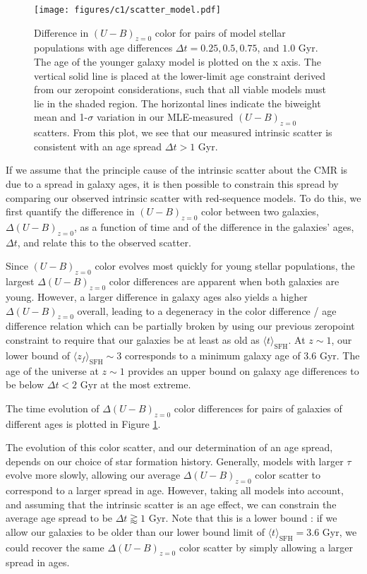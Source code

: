 \begin{figure}
\texttt{[image: figures/c1/scatter\_model.pdf]}
\caption[Using the color-magnitude relation scatter to constrain scatter in red-sequence ages]{Difference in $(U-B)_{z=0}$ color for pairs of model stellar populations with age differences $\Delta t = 0.25, 0.5, 0.75$, and $1.0$ Gyr. The age of the younger galaxy model is plotted on the x axis. The vertical solid line is placed at the lower-limit age constraint derived from our zeropoint considerations, such that all viable models must lie in the shaded region. The horizontal lines indicate the biweight mean and 1-$\sigma$ variation in our MLE-measured $(U-B)_{z=0}$ scatters. From this plot, we see that our measured intrinsic scatter is consistent with an age spread $\Delta t > 1$ Gyr.
\label{fig-scatmodel}}
\end{figure}

If we assume that the principle cause of the intrinsic scatter about the CMR is due to a spread in galaxy ages, it is then possible to constrain this spread by comparing our observed intrinsic scatter with red-sequence models. To do this, we first quantify the difference in $(U-B)_{z=0}$ color between two galaxies, $\Delta(U-B)_{z=0}$, as a function of time and of the difference in the galaxies' ages, $\Delta t$, and relate this to the observed scatter.

Since $(U-B)_{z=0}$ color evolves most quickly for young stellar populations, the largest $\Delta(U-B)_{z=0}$ color differences are apparent when both galaxies are young.
However, a larger difference in galaxy ages also yields a higher $\Delta(U-B)_{z=0}$ overall, leading to a degeneracy in the color difference / age difference relation which can be partially broken by using our previous zeropoint constraint to require that our galaxies be at least as old as $\langle t \rangle_\mathrm{SFH}$.
At $z \sim 1$, our lower bound of $\langle z_f \rangle_\mathrm{SFH} \sim 3$ corresponds to a minimum galaxy age of 3.6 Gyr.
The age of the universe at $z \sim 1$ provides an upper bound on galaxy age differences to be below $\Delta t < 2 $ Gyr at the most extreme.

The time evolution of $\Delta(U-B)_{z=0}$ color differences for pairs of galaxies of different ages is plotted in Figure \ref{fig-scatmodel}.

The evolution of this color scatter, and our determination of an age spread, depends on our choice of star formation history. Generally, models with larger $\tau$ evolve more slowly, allowing our average $\Delta(U-B)_{z=0}$ color scatter to correspond to a larger spread in age. However, taking all models into account, and assuming that the intrinsic scatter is an age effect, we can constrain the average age spread to be $\Delta t \gtrapprox 1$ Gyr. Note that this is a lower bound : if we allow our galaxies to be older than our lower bound limit of $\langle t \rangle_\mathrm{SFH} = 3.6$ Gyr,  we could recover the same $\Delta(U-B)_{z=0}$ color scatter by simply allowing a larger spread in ages. %

